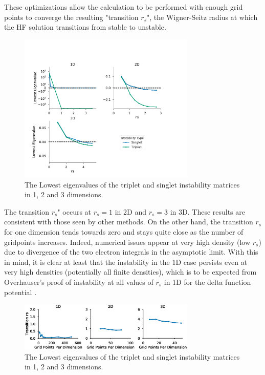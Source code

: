 \documentclass{revtex4}
\begin{document}
     
     These optimizations allow the calculation to be performed with enough grid points to converge 
     the resulting "transition $r_s$", the Wigner-Seitz radius at which the HF solution transitions 
     from stable to unstable.          
      \begin{figure}[H]
      \centering
        \includegraphics[width=0.75\textwidth]{../figures/stability.pdf}
        \caption{The Lowest eigenvalues of the triplet and singlet instability matrices in 1, 2 and
        3 dimensions.}
      \end{figure}   
        
    The transition $r_s$" occurs at $r_s = 1$ in 2D and $r_s = 3$ in 3D. These 
    results are consistent with those seen by other methods\cite{Baguet2014}\cite{Bernu2011}. On 
    the other hand, the transition 
    $r_s$ for one dimension tends towards zero and stays quite close as the number of gridpoints 
    increases. Indeed, numerical issues appear at very high density (low $r_s$) due to divergence 
    of the two electron integrals in the asymptotic limit. With this in mind, it is clear at least 
    that the instability in the 1D case persists even at very high densities (potentially all 
    finite densities), which is to be expected from Overhauser's proof of instability at all 
    values of $r_s$ in 1D for the delta function potential \cite{Overhauser1962}.


    \begin{figure}[H]
    \centering
      \includegraphics[width=0.75\textwidth]{../figures/triplet_onset.eps}
      \caption{The Lowest eigenvalues of the triplet and singlet instability matrices in 1, 2 and
      3 dimensions.}
    \end{figure}
    
\end{document}
